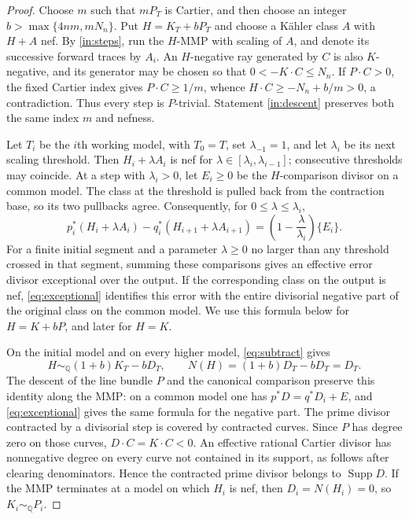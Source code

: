 \documentclass[11pt,a4paper]{article}
\theoremstyle{definition}\newtheorem{definition}[theorem]{Definition}
\theoremstyle{remark}\newtheorem*{remark}{Remark}
\newcommand{\Q}{\mathbb Q}\newcommand{\C}{\mathbb C}
\newcommand{\Supp}{\operatorname{Supp}}\newcommand{\Sing}{\operatorname{Sing}}
\begin{document}
\begin{proof}
Choose $m$ such that $mP_T$ is Cartier, and then choose an integer
$b>\max\{4nm,mN_n\}$. Put $H=K_T+bP_T$ and choose a Kähler class $A$
with $H+A$ nef. By \ref{in:steps}, run the $H$-MMP with scaling of $A$,
and denote its successive forward traces by $A_i$.
An $H$-negative ray generated by $C$ is also
$K$-negative, and its generator may be chosen so that
$0<-K\cdot C\le N_n$.
If $P\cdot C>0$, the fixed Cartier index gives $P\cdot C\ge1/m$, whence
$H\cdot C\ge-N_n+b/m>0$, a contradiction. Thus every step is $P$-trivial.
Statement \ref{in:descent} preserves both the same index $m$ and nefness.

Let $T_i$ be the $i$th working model, with $T_0=T$, set $\lambda_{-1}=1$, and let
$\lambda_i$ be its next scaling threshold. Then $H_i+\lambda A_i$ is nef
for $\lambda\in[\lambda_i,\lambda_{i-1}]$; consecutive thresholds may
coincide. At a step with $\lambda_i>0$, let $E_i\ge0$ be the
$H$-comparison divisor on a common model.
The class at the threshold is pulled back from the contraction
base, so its two pullbacks agree. Consequently, for $0\le\lambda\le\lambda_i$,
\begin{equation}\label{eq:scaling-comparison}
 p_i^*(H_i+\lambda A_i)-q_i^*(H_{i+1}+\lambda A_{i+1})
   =\left(1-\frac{\lambda}{\lambda_i}\right)\{E_i\}.
\end{equation}
For a finite initial segment and a parameter $\lambda\ge0$ no larger than
any threshold crossed in that segment, summing these comparisons gives an
effective error divisor exceptional over the output.
If the corresponding class on the output is nef,
\eqref{eq:exceptional} identifies this error with the entire divisorial negative
part of the original class on the common model. We use this formula below for
$H=K+bP$, and later for $H=K$.

On the initial model and on every higher model, \eqref{eq:subtract} gives
\[
 H\sim_\Q(1+b)K_T-bD_T,
 \qquad N(H)=(1+b)D_T-bD_T=D_T.
\]
The descent of the line bundle $P$ and the canonical comparison preserve
this identity along the MMP: on a common model one has
$p^*D=q^*D_i+E$, and \eqref{eq:exceptional} gives the same formula for the
negative part. The prime divisor contracted by a divisorial step is covered by
contracted curves. Since $P$ has degree zero on those curves,
$D\cdot C=K\cdot C<0$. An effective rational Cartier divisor has nonnegative
degree on every curve not contained in its support, as follows after clearing
denominators. Hence the contracted prime divisor
belongs to $\Supp D$.
If the MMP terminates at a model on which $H_i$ is nef, then
$D_i=N(H_i)=0$, so $K_i\sim_\Q P_i$.


\end{proof}
\end{document}
